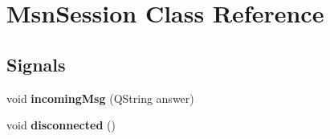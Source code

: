 \hypertarget{classMsnSession}{
\section{MsnSession Class Reference}
\label{classMsnSession}
}
\subsection*{Signals}
\begin{DoxyCompactItemize}
\item 
\hypertarget{classMsnSession_a5abea6a694eb03afe3b4a6fac8af884b}{
void {\bfseries incomingMsg} (QString answer)}
\label{classMsnSession_a5abea6a694eb03afe3b4a6fac8af884b}

\item 
\hypertarget{classMsnSession_ad60cd76fc8b3cadeb622888ec34f01e4}{
void {\bfseries disconnected} ()}
\label{classMsnSession_ad60cd76fc8b3cadeb622888ec34f01e4}

\end{DoxyCompactItemize}
